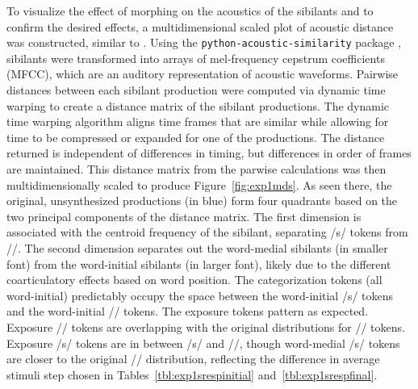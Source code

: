 To visualize the effect of morphing on the acoustics of the sibilants and to confirm the desired effects, a multidimensional scaled plot of acoustic distance was constructed, similar to \citet{Mielke2012}.  
Using the \texttt{python-acoustic-similarity} package \citep{McAuliffe2015}, sibilants were transformed into arrays of mel-frequency cepstrum coefficients (MFCC), which are an auditory representation of acoustic waveforms.
Pairwise distances between each sibilant production were computed via dynamic time warping to create a distance matrix of the sibilant productions.
The dynamic time warping algorithm aligns time frames that are similar while allowing for time to be compressed or expanded for one of the productions.
The distance returned is independent of differences in timing, but differences in order of frames are maintained.
This distance matrix from the parwise calculations was then multidimensionally scaled to produce Figure~\ref{fig:exp1mds}.  
As seen there, the original, unsynthesized productions (in blue) form four quadrants based on the two principal components of the distance matrix. 
 The first dimension is associated with the centroid frequency of the sibilant, separating /s/ tokens from /\textesh/.  
The second dimension separates out the word-medial sibilants (in smaller font) from the word-initial sibilants (in larger font), likely due to the different coarticulatory effects based on word position.  
The categorization tokens (all word-initial) predictably occupy the space between the word-initial /s/ tokens and the word-initial /\textesh/ tokens. 
 The exposure tokens pattern as expected.  Exposure /\textesh/ tokens are overlapping with the original distributions for /\textesh/ tokens.  
Exposure /s/ tokens are in between /s/ and /\textesh/, though word-medial /s/ tokens are closer to the original /\textesh/ distribution, reflecting the difference in average stimuli step chosen in Tables~\ref{tbl:exp1srespinitial} and~\ref{tbl:exp1srespfinal}.

